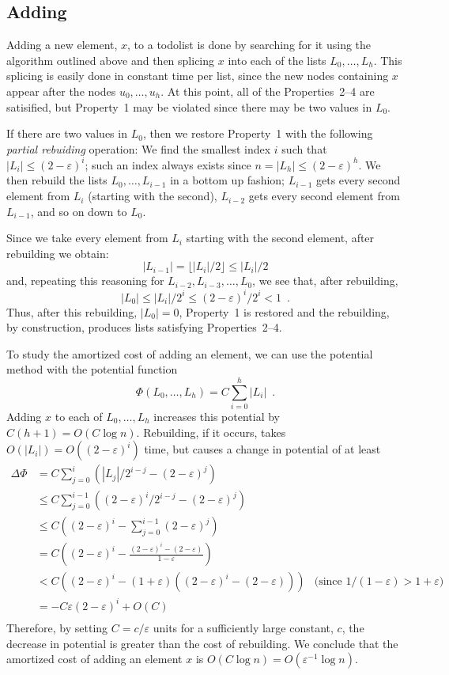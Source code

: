 \documentclass[lotsofwhite]{patmorin}
\newcommand{\eps}{\varepsilon}
\begin{document}
\subsection{Adding}

Adding a new element, $x$, to a todolist is done by searching for it
using the algorithm outlined above and then splicing $x$ into each of
the lists $L_0,\ldots,L_h$.  This splicing is easily done in constant
time per list, since the new nodes containing $x$ appear after the nodes
$u_0,\ldots,u_h$.  At this point, all of the Properties~2--4 are satisified,
but Property~1 may be violated since there may be two values in $L_0$.

If there are two values in $L_0$, then we restore Property~1 with the
following \emph{partial rebuiding} operation: We find the smallest index
$i$ such that $|L_i|\le (2-\eps)^i$; such an index always exists since
$n=|L_h|\le(2-\eps)^h$.  We then rebuild the lists $L_{0},\ldots,L_{i-1}$
in a bottom up fashion; $L_{i-1}$ gets every second element from $L_i$
(starting with the second), $L_{i-2}$ gets every second element from
$L_{i-1}$, and so on down to $L_0$.

Since we take every element from $L_i$ starting with the second element,
after rebuilding we obtain:
\[
   |L_{i-1}| = \lfloor |L_i|/2 \rfloor \le |L_i|/2
\]
and, repeating this reasoning for $L_{i-2}, L_{i-3},\ldots, L_0$, we see that, after rebuilding,
\[
   |L_{0}| \le |L_i|/2^i \le (2-\eps)^i/2^i < 1 \enspace .
\]
Thus, after this rebuilding, $|L_0|=0$, Property~1 is restored and the
rebuilding, by construction, produces lists satisfying Properties~2--4.

To study the amortized cost of adding an element, we
can use the potential method with the potential function
\[
    \Phi(L_0,\ldots,L_h)=C\sum_{i=0}^h|L_i| \enspace .
\]
Adding $x$ to each of $L_0,\ldots,L_h$ increases this potential by
$C(h+1)=O(C\log n)$.  Rebuilding, if it occurs, takes $O(|L_i|)=O((2-\eps)^i)$
time, but causes a change in potential of at least
\begin{align*}
     \Delta\Phi & = C\sum_{j=0}^i\left(|L_j|/2^{i-j} - (2-\eps)^j\right) \\
          & \le C\sum_{j=0}^{i-1}\left((2-\eps)^i/2^{i-j} - (2-\eps)^j\right) \\
          & \le C\left((2-\eps)^i - \sum_{j=0}^{i-1}(2-\eps)^j\right) \\
          & = C\left((2-\eps)^i - \frac{(2-\eps)^i-(2-\eps)}{1-\eps}\right) \\
          & < C\left((2-\eps)^i - (1+\eps)\left((2-\eps)^i-(2-\eps)\right)\right)
           & \text{(since $1/(1-\eps)>1+\eps$)} \\
          & = -C\eps(2-\eps)^i + O(C) \\
\end{align*}
Therefore, by setting $C=c/\eps$ units for a sufficiently large constant,
$c$, the decrease in potential is greater than the cost of rebuilding.
We conclude that the amortized cost of adding an element $x$ is $O(C\log
n)=O(\eps^{-1}\log n)$.
\end{document}
